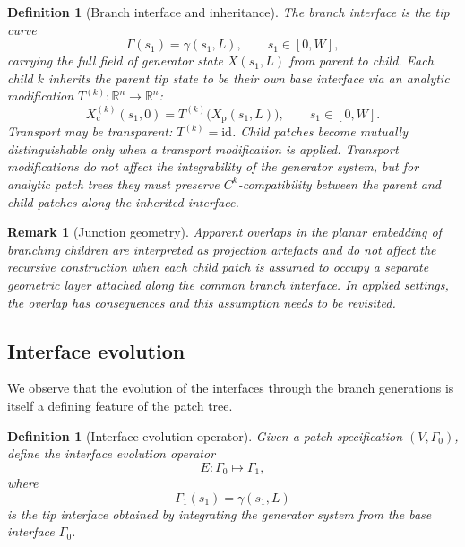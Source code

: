 \documentclass[11pt,a4paper]{article}
\newtheorem{definition}[theorem]{Definition}
\newtheorem{remark}[theorem]{Remark}
\begin{document}
\begin{definition}[Branch interface and inheritance]
\label{def:interface}
The \emph{branch interface} is the tip curve
\[
    \Gamma(s_1) = \gamma(s_1, L), \qquad s_1 \in [0,W],
\]
carrying the full field of generator state $X(s_1,L)$ from parent
to child. Each child $k$ inherits the parent tip state to be their own 
base interface via an analytic \emph{modification} 
$T^{(k)}:\mathbb{R}^n\to\mathbb{R}^n$:
\begin{equation}
    X_{\mathrm{c}}^{(k)}(s_1,0)
    = T^{(k)}\!\bigl(X_{\mathrm{p}}(s_1,L)\bigr),
    \qquad s_1\in[0,W].
    \label{eq:interface_def}
\end{equation}
Transport may be \emph{transparent}: $T^{(k)}=\mathrm{id}$. Child patches
become mutually distinguishable only when a transport modification is
applied. Transport modifications do not affect the integrability of the
generator system, but for analytic patch trees they must preserve 
$C^k$-compatibility between the parent and child patches along the inherited interface.
\end{definition}

\begin{remark}[Junction geometry]
\label{rem:junction}
Apparent overlaps in the planar embedding of branching children
are interpreted as projection artefacts and do not affect the
recursive construction when each child patch is assumed to occupy
a separate geometric layer attached along the common branch
interface. In applied settings, the overlap has consequences and 
this assumption needs to be revisited.
\end{remark}

\subsection{Interface evolution}
\label{sec:evolution}

We observe that the evolution of the interfaces through the branch generations
is itself a defining feature of the patch tree.

\begin{definition}[Interface evolution operator]
\label{def:evolution}
Given a patch specification $(V,\Gamma_0)$, define the
\emph{interface evolution operator}
\begin{equation}
    E : \Gamma_0 \mapsto \Gamma_1,
    \label{eq:evolution}
\end{equation}
where
\[
    \Gamma_1(s_1)
    =
    \gamma(s_1,L)
\]
is the tip interface obtained by integrating the generator system
from the base interface $\Gamma_0$.
\end{definition}
\end{document}
